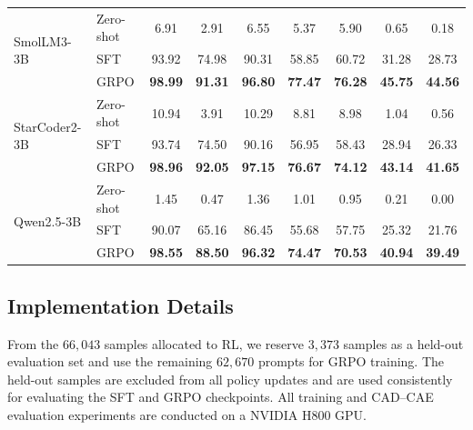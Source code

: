 \begin{table}[t]
{\begin{tabular}{llccccccc}
        \midrule

        \multirow{3}{*}{SmolLM3-3B}
        & Zero-shot
        & 6.91 & 2.91 & 6.55
        & 5.37 & 5.90 & 0.65 & 0.18 \\
        & SFT
        & 93.92 & 74.98 & 90.31
        & 58.85 & 60.72 & 31.28 & 28.73 \\
        & GRPO
        & \textbf{98.99} & \textbf{91.31} & \textbf{96.80}
        & \textbf{77.47} & \textbf{76.28}
        & \textbf{45.75} & \textbf{44.56} \\

        \midrule

        \multirow{3}{*}{StarCoder2-3B}
        & Zero-shot
        & 10.94 & 3.91 & 10.29
        & 8.81 & 8.98 & 1.04 & 0.56 \\
        & SFT
        & 93.74 & 74.50 & 90.16
        & 56.95 & 58.43 & 28.94 & 26.33 \\
        & GRPO
        & \textbf{98.96} & \textbf{92.05} & \textbf{97.15}
        & \textbf{76.67} & \textbf{74.12}
        & \textbf{43.14} & \textbf{41.65} \\

        \midrule

        \multirow{3}{*}{Qwen2.5-3B}
        & Zero-shot
        & 1.45
        & 0.47
        & 1.36
        & 1.01
        & 0.95
        & 0.21
        & 0.00 \\
        & SFT
        & 90.07 & 65.16 & 86.45
        & 55.68 & 57.75 & 25.32 & 21.76 \\
        & GRPO
        & \textbf{98.55} & \textbf{88.50} & \textbf{96.32}
        & \textbf{74.47} & \textbf{70.53}
        & \textbf{40.94} & \textbf{39.49} \\

        \bottomrule
    \end{tabular}
    }
    \vspace{-1em}
\end{table}


\subsection{Implementation Details}
\label{sec:implementation}

From the \(66{,}043\) samples allocated to RL, we reserve \(3{,}373\) samples as a held-out evaluation set and use the remaining \(62{,}670\) prompts for GRPO training. The held-out samples are excluded from all policy updates and are used consistently for evaluating the SFT and GRPO checkpoints. All training and CAD--CAE evaluation experiments are conducted on a NVIDIA H800 GPU.

